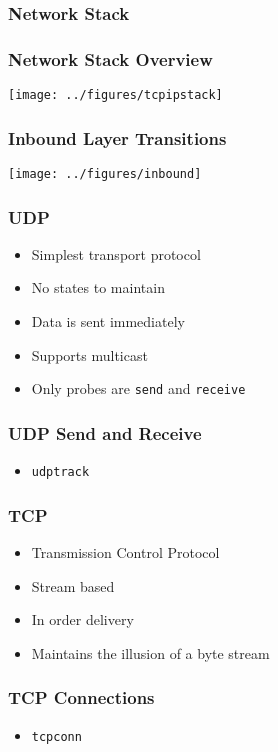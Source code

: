 \documentclass[pdftex]{beamer}
\begin{document}
\begin{frame}
  \frametitle{Network Stack}
\end{frame}

\begin{frame}
  \frametitle{Network Stack Overview}
\centering
\texttt{[image: ../figures/tcpipstack]}
\end{frame}

\begin{frame}
\centering
  \frametitle{Inbound Layer Transitions}
\texttt{[image: ../figures/inbound]}
\end{frame}

\begin{frame}[fragile]
  \frametitle{UDP}
  \begin{itemize}
  \item Simplest transport protocol
  \item No states to maintain
  \item Data is sent immediately
  \item Supports multicast
  \item Only probes are \verb+send+ and \verb+receive+
  \end{itemize}
\end{frame}

\begin{frame}[fragile]
  \frametitle{UDP Send and Receive}
  \begin{itemize}
  \item \verb|udptrack|
  \end{itemize}
\end{frame}

\begin{frame}
  \frametitle{TCP}
  \begin{itemize}
  \item Transmission Control Protocol
  \item Stream based
  \item In order delivery
  \item Maintains the illusion of a byte stream
  \end{itemize}
\end{frame}

\begin{frame}[fragile]
  \frametitle{TCP Connections}
  \begin{itemize}
  \item \verb|tcpconn|
  \end{itemize}
\end{frame}
\end{document}
